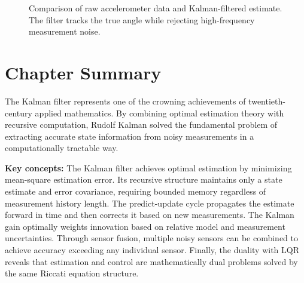 \begin{figure}[htbp]
\centering
{}
\caption{Comparison of raw accelerometer data and Kalman-filtered estimate. The filter tracks the true angle while rejecting high-frequency measurement noise.}
\label{fig:filter_comparison}
\end{figure}

\section{Chapter Summary}

The Kalman filter represents one of the crowning achievements of twentieth-century applied mathematics. By combining optimal estimation theory with recursive computation, Rudolf Kalman solved the fundamental problem of extracting accurate state information from noisy measurements in a computationally tractable way.

\textbf{Key concepts:} The Kalman filter achieves optimal estimation by minimizing mean-square estimation error. Its recursive structure maintains only a state estimate and error covariance, requiring bounded memory regardless of measurement history length. The predict-update cycle propagates the estimate forward in time and then corrects it based on new measurements. The Kalman gain optimally weights innovation based on relative model and measurement uncertainties. Through sensor fusion, multiple noisy sensors can be combined to achieve accuracy exceeding any individual sensor. Finally, the duality with LQR reveals that estimation and control are mathematically dual problems solved by the same Riccati equation structure.

